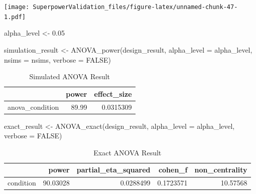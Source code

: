 \documentclass[
]{book}
\newenvironment{Shaded}{\begin{snugshade}}{\end{snugshade}}
\newcommand{\AttributeTok}[1]{\textcolor[rgb]{0.77,0.63,0.00}{#1}}
\newcommand{\ConstantTok}[1]{\textcolor[rgb]{0.00,0.00,0.00}{#1}}
\newcommand{\FloatTok}[1]{\textcolor[rgb]{0.00,0.00,0.81}{#1}}
\newcommand{\FunctionTok}[1]{\textcolor[rgb]{0.00,0.00,0.00}{#1}}
\newcommand{\NormalTok}[1]{#1}
\newcommand{\OtherTok}[1]{\textcolor[rgb]{0.56,0.35,0.01}{#1}}
\begin{document}
\texttt{[image: SuperpowerValidation\_files/figure-latex/unnamed-chunk-47-1.pdf]}

\begin{Shaded}
\begin{Highlighting}[]
\NormalTok{alpha\_level }\OtherTok{\textless{}{-}} \FloatTok{0.05}
\end{Highlighting}
\end{Shaded}

\begin{Shaded}
\begin{Highlighting}[]
\NormalTok{simulation\_result }\OtherTok{\textless{}{-}} \FunctionTok{ANOVA\_power}\NormalTok{(design\_result,}
                                 \AttributeTok{alpha\_level =}\NormalTok{ alpha\_level,}
                                 \AttributeTok{nsims =}\NormalTok{ nsims,}
                                 \AttributeTok{verbose =} \ConstantTok{FALSE}\NormalTok{)}
\end{Highlighting}
\end{Shaded}

\begin{table}[!h]

\caption{\label{tab:unnamed-chunk-49}Simulated ANOVA Result}
\centering
\begin{tabular}[t]{l|r|r}
\hline
  & power & effect\_size\\
\hline
anova\_condition & 89.99 & 0.0315309\\
\hline
\end{tabular}
\end{table}

\begin{Shaded}
\begin{Highlighting}[]
\NormalTok{exact\_result }\OtherTok{\textless{}{-}} \FunctionTok{ANOVA\_exact}\NormalTok{(design\_result,}
                            \AttributeTok{alpha\_level =}\NormalTok{ alpha\_level,}
                            \AttributeTok{verbose =} \ConstantTok{FALSE}\NormalTok{)}
\end{Highlighting}
\end{Shaded}

\begin{table}[!h]

\caption{\label{tab:unnamed-chunk-51}Exact ANOVA Result}
\centering
\begin{tabular}[t]{l|r|r|r|r}
\hline
  & power & partial\_eta\_squared & cohen\_f & non\_centrality\\
\hline
condition & 90.03028 & 0.0288499 & 0.1723571 & 10.57568\\
\hline
\end{tabular}
\end{table}
\end{document}
